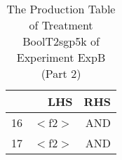 \begin{table}[ht]
\centering
\begin{tabular}{rrr}
  \hline
 & LHS & RHS \\ 
  \hline
16 & $<$f2$>$ & AND \\ 
  17 & $<$f2$>$ & AND \\ 
   \hline
\end{tabular}
\caption{The Production Table of Treatment BoolT2sgp5k of Experiment ExpB (Part 2)} 
\end{table}
